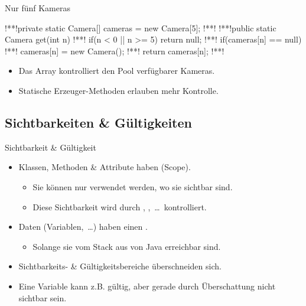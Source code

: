 {\begin{frame}[fragile,c]{Nur fünf Kameras}
\begin{plainjava}
!**!private static Camera[] cameras = new Camera[5];
!**!
!**!public static Camera get(int n) {
!**!   if(n < 0 || n >= 5) return null;
!**!   if(cameras[n] == null)
!**!      cameras[n] = new Camera();
!**!   return cameras[n];
!**!}
\end{plainjava}
\begin{itemize}
   \itemsep6pt
   \item<7-> Das Array kontrolliert den Pool verfügbarer Kameras.
   \item<8-> Statische Erzeuger-Methoden erlauben mehr Kontrolle.
\end{itemize}
\end{frame}
\SidebarReset

\subsection{Sichtbarkeiten \& Gültigkeiten}
\begin{frame}{Sichtbarkeit \& Gültigkeit}
   \begin{itemize}[<+(1)->]
      \itemsep14pt
      \item Klassen, Methoden \& Attribute haben  (Scope). \begin{itemize}
         \item Sie können nur verwendet werden, wo sie sichtbar sind.
         \item Diese Sichtbarkeit wird durch , ,~\ldots\ kontrolliert.
      \end{itemize}
      \item Daten (Variablen,~\ldots) haben einen . \begin{itemize}
         \item Solange sie vom Stack aus von Java erreichbar sind.
      \end{itemize}
      \item Sichtbarkeits- \& Gültigkeitsbereiche überschneiden sich.
      \item Eine Variable kann z.B. gültig, aber gerade durch Überschattung nicht sichtbar sein.
   \end{itemize}
\end{frame}

}
